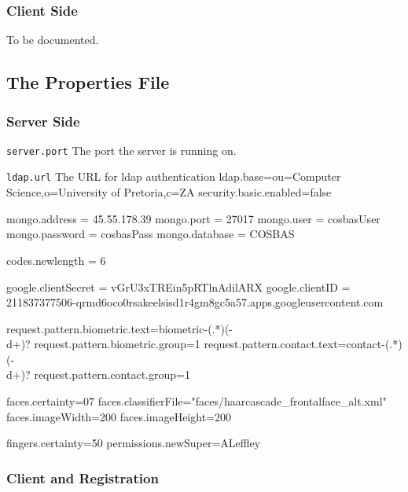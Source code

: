 \subsubsection{Client Side}
To be documented.

\subsection{The Properties File}
\subsubsection{Server Side}
\item \verb!server.port! The port the server is running on.
\item \verb!ldap.url! The URL for ldap authentication
ldap.base=ou=Computer Science,o=University of Pretoria,c=ZA
security.basic.enabled=false

mongo.address = 45.55.178.39
mongo.port = 27017
mongo.user = cosbasUser
mongo.password = cosbasPass
mongo.database = COSBAS

codes.newlength = 6

google.clientSecret = vGrU3xTREin5pRTlnAdilARX
google.clientID = 211837377506-qrmd6oco0rsakeelsisd1r4gm8gc5a57.apps.googleusercontent.com

request.pattern.biometric.text=biometric-(.*)(-\\d+)?
request.pattern.biometric.group=1
request.pattern.contact.text=contact-(.*)(-\\d+)?
request.pattern.contact.group=1

faces.certainty=0\.7
faces.classifierFile="faces/haarcascade_frontalface_alt.xml"
faces.imageWidth=200
faces.imageHeight=200

fingers.certainty=50
permissions.newSuper=ALeffley

\subsubsection{Client and Registration}